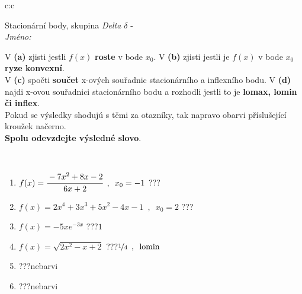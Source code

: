 \documentclass[10pt]{report}
\begin{document}
\newpage
\thispagestyle{empty}
\begin{tabular}{c:c}
\begin{minipage}[c][104.5mm][t]{0.5\linewidth}
\begin{center}
\vspace{7mm}
{\huge Stacionární body, skupina \textit{Delta $\delta$} -}\\[5mm]
\textit{Jméno:}\phantom{xxxxxxxxxxxxxxxxxxxxxxxxxxxxxxxxxxxxxxxxxxxxxxxxxxxxxxxxxxxxxxxxx}\\[5mm]
\begin{minipage}{0.95\linewidth}
\begin{center}
{\small V \textbf{(a)} zjisti jestli $f(x)$ \textbf{roste} v bode $x_0$. V \textbf{(b)} zjisti jestli je $f(x)$ v bode $x_0$ \textbf{ryze konvexní}.\\V \textbf{(c)} spočti \textbf{součet} x-ových souřadnic stacionárního a inflexního bodu. V \textbf{(d)} najdi x-ovou souřadnici stacionárního bodu a rozhodli jestli to je \textbf{lomax, lomin či inflex}.\\Pokud se výsledky shodujú s těmi za otazníky, tak napravo obarvi příslušející kroužek načerno.\\\textbf{Spolu odevzdejte výsledné slovo}}.
\end{center}
\end{minipage}
\\[1mm]
\begin{minipage}{0.79\linewidth}
\begin{center}
\begin{varwidth}{\linewidth}
\begin{enumerate}
\normalsize
\item $f(x)=\cfrac{-7x^2+8x-2}{6x+2}\enspace , \enspace x_0=-1$\quad \dotfill\; ???\;\dotfill \quad {}
\item $f(x)=2x^4+3x^3+5x^2-4x-1\enspace , \enspace x_0=2$\quad \dotfill\; ???\;\dotfill \quad {}
\item $f(x)=-5xe^{-3x}$\quad \dotfill\; ???\;\dotfill \quad $1$
\item $f(x)=\sqrt{2x^2-x+2}$\quad \dotfill\; ???\;\dotfill \quad $\nicefrac{1}{4}\enspace , \enspace \mathrm{lomin}$
\item \quad \dotfill\; ???\;\dotfill \quad nebarvi
\item \quad \dotfill\; ???\;\dotfill \quad nebarvi
\end{enumerate}
\end{varwidth}
\end{center}

\end{minipage}
\end{center}
\end{minipage}
\end{tabular}
\end{document}
